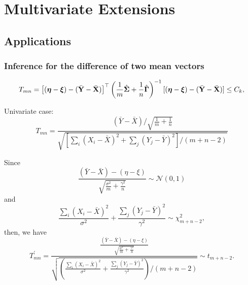 \chapter{Multivariate Extensions}

\section{Applications}

\subsection{Inference for the diﬀerence of two mean vectors}

\begin{equation*}
	T_{mn}=\left[(\boldsymbol{\eta}-\boldsymbol{\xi})-(\bar{{\bf Y}}-\bar{{\bf X}})\right]^{\top}\left(\frac{1}{m}\hat{\boldsymbol{\Sigma}}+\frac{1}{n}\hat{\boldsymbol{\Gamma}}\right)^{-1}[(\boldsymbol{\eta}-\boldsymbol{\xi})-(\bar{{\bf Y}}-\bar{{\bf X}})]\leq C_{k},
\end{equation*}

Univariate case:
\begin{equation*}
	T_{mn}=\frac{(\bar{Y}-\bar{X})/\sqrt{\frac{1}{m}+\frac{1}{n}}}{\sqrt{\left[\sum_{i}\left(X_i-\bar{X}\right)^2+\sum_{j}\left(Y_j-\bar{Y}\right)^2\right]/(m+n-2)}}
\end{equation*}

Since
\begin{equation*}
	\frac{(\bar{Y}-\bar{X})-(\eta-\xi)}{\sqrt{\frac{\sigma^{2}}{m}+\frac{\gamma^{2}}{n}}}\sim\mathcal{N}(0,1)
\end{equation*}
and
\begin{equation*}
	\frac{\sum_{i}\left(X_i-\bar{X}\right)^2}{\sigma^{2}}+\frac{\sum_{j}\left(Y_j-\bar{Y}\right)^2}{\gamma^{2}}\sim\chi^{2}_{m+n-2},
\end{equation*}
then, we have
\begin{equation*}
	T_{mn}^{\prime}=\frac{\frac{(\bar{Y}-\bar{X})-(\eta-\xi)}{\sqrt{\frac{\sigma^{2}}{m}+\frac{\gamma^{2}}{n}}}}{\sqrt{\left(\frac{\sum_{i}\left(X_i-\bar{X}\right)^2}{\sigma^{2}}+\frac{\sum_{j}\left(Y_j-\bar{Y}\right)^2}{\gamma^{2}}\right)/(m+n-2)}}\sim t_{m+n-2}.
\end{equation*}

